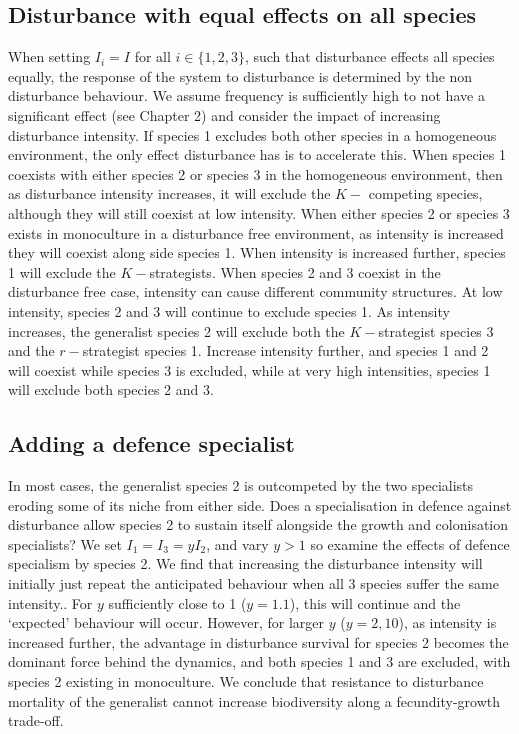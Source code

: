 \documentclass[preprint,10pt,reqno]{amsart}
\begin{document}
\subsection{Disturbance with equal effects on all species} \label{ss:homo}
When setting $I_i=I$ for all $i \in \{1,2,3\}$, such that disturbance effects all species equally, the response of the system to disturbance is determined by the non disturbance behaviour. We assume frequency is sufficiently high to not have a significant effect (see Chapter 2) and consider the impact of increasing disturbance intensity. If species 1 excludes both other species in a homogeneous environment, the only effect disturbance has is to accelerate this. When species 1 coexists with either species 2 or species 3 in the homogeneous environment, then as disturbance intensity increases, it will exclude the $K-$ competing species, although they will still coexist at low intensity. When either species 2 or species 3 exists in monoculture in a disturbance free environment, as intensity is increased they will coexist along side species 1. When intensity is increased further, species 1 will exclude the $K-$strategists. When species 2 and 3 coexist in the disturbance free case, intensity can cause different community structures. At low intensity, species 2 and 3 will continue to exclude species 1. As intensity increases, the generalist species 2 will exclude both the $K-$strategist species 3 and the $r-$strategist species 1. Increase intensity further, and species 1 and 2 will coexist while species 3 is excluded, while at very high intensities, species 1 will exclude both species 2 and 3.

\subsection{Adding a defence specialist}
In most cases, the generalist species 2 is outcompeted by the two specialists eroding some of its niche from either side. Does a specialisation in defence against disturbance allow species 2 to sustain itself alongside the growth and colonisation specialists? We set $I_1=I_3=yI_2$, and vary $y>1$ so examine the effects of defence specialism by species 2. We find that increasing the disturbance intensity will initially just repeat the anticipated behaviour when all 3 species suffer the same intensity.. For $y$ sufficiently close to 1 ($y=1.1$), this will continue and the `expected' behaviour will occur. However, for larger $y$ ($y=2,10$), as intensity is increased further, the advantage in disturbance survival for species 2 becomes the dominant force behind the dynamics, and both species 1 and 3 are excluded, with species 2 existing in monoculture. We conclude that resistance to disturbance mortality of the generalist cannot increase biodiversity along a fecundity-growth trade-off.
\end{document}
